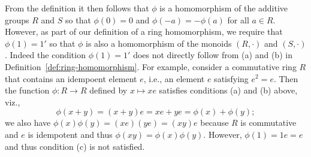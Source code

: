 From the definition it then follows that \(\phi\) is a homomorphism of the additive groups \(R\) and \(S\) so that \(\phi(0) = 0\) and \(\phi(-a) = -\phi(a)\) for all \(a \in R\). However, as part of our definition of a ring homomorphism, we require that \(\phi(1) = 1'\) so that \(\phi\) is also a homomorphism of the monoids \((R, \cdot)\) and \((S, \cdot)\). Indeed the condition \(\phi(1) = 1'\) does not directly follow from (a) and (b) in Definition~\ref{def:ring-homomorphism}. For example, consider a commutative ring \(R\) that contains an idempoent element \(e\), i.e., an element \(e\) satisfying \(e^2 = e\). Then the function \(\phi: R \to R\) defined by \(x \mapsto xe\) satisfies conditions (a) and (b) above, viz., \[\phi(x + y) = (x + y)e = xe + ye = \phi(x) + \phi(y);\] we also have \(\phi(x) \phi(y) = (xe)(ye) = (xy)e\) because \(R\) is commutative and \(e\) is idempotent and thus \(\phi(xy) = \phi(x) \phi(y)\). However, \(\phi(1) = 1e = e\) and thus condition (c) is not satisfied.